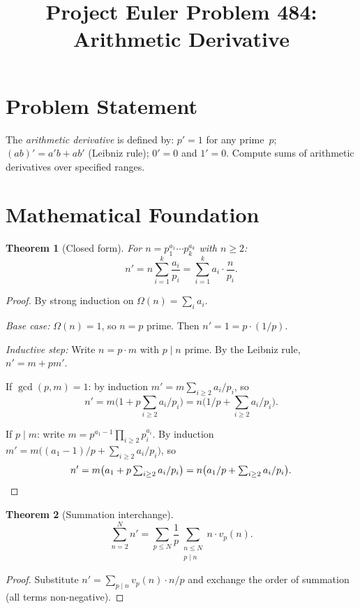 \documentclass[12pt]{article}
\title{Project Euler Problem 484: Arithmetic Derivative}
\author{}
\date{}
\newtheorem{theorem}{Theorem}
\begin{document}
\maketitle

\section{Problem Statement}
The \emph{arithmetic derivative} is defined by: $p'=1$ for any prime~$p$; $(ab)'=a'b+ab'$ (Leibniz rule); $0'=0$ and $1'=0$. Compute sums of arithmetic derivatives over specified ranges.

\section{Mathematical Foundation}

\begin{theorem}[Closed form]
For $n = p_1^{a_1}\cdots p_k^{a_k}$ with $n\ge 2$:
\[
n' = n\sum_{i=1}^k \frac{a_i}{p_i} = \sum_{i=1}^k a_i\cdot\frac{n}{p_i}.
\]
\end{theorem}

\begin{proof}
By strong induction on $\Omega(n) = \sum_i a_i$.

\emph{Base case:} $\Omega(n)=1$, so $n=p$ prime. Then $n'=1=p\cdot(1/p)$. \checkmark

\emph{Inductive step:} Write $n=p\cdot m$ with $p\mid n$ prime. By the Leibniz rule, $n' = m + pm'$.

If $\gcd(p,m)=1$: by induction $m' = m\sum_{i\ge 2}a_i/p_i$, so
\[
n' = m\bigl(1+p\textstyle\sum_{i\ge 2}a_i/p_i\bigr) = n\bigl(1/p+\textstyle\sum_{i\ge 2}a_i/p_i\bigr).
\]

If $p\mid m$: write $m=p^{a_1-1}\prod_{i\ge 2}p_i^{a_i}$. By induction $m'=m\bigl((a_1-1)/p+\sum_{i\ge 2}a_i/p_i\bigr)$, so
\[
n' = m\bigl(a_1+p\textstyle\sum_{i\ge 2}a_i/p_i\bigr) = n\bigl(a_1/p+\textstyle\sum_{i\ge 2}a_i/p_i\bigr). \qedhere
\]
\end{proof}

\begin{theorem}[Summation interchange]
\[
\sum_{n=2}^N n' = \sum_{p\le N}\frac{1}{p}\sum_{\substack{n\le N\\p\mid n}} n\cdot v_p(n).
\]
\end{theorem}

\begin{proof}
Substitute $n' = \sum_{p\mid n}v_p(n)\cdot n/p$ and exchange the order of summation (all terms non-negative).
\end{proof}
\end{document}
